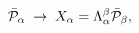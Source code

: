 \begin{equation}
\bar{{\cal P}}_{\alpha}\;\rightarrow\;X_{\alpha}=\Lambda_{\alpha}^{\beta
}\bar{{\cal P}}_{\beta},\label{3.1}%
\end{equation}

